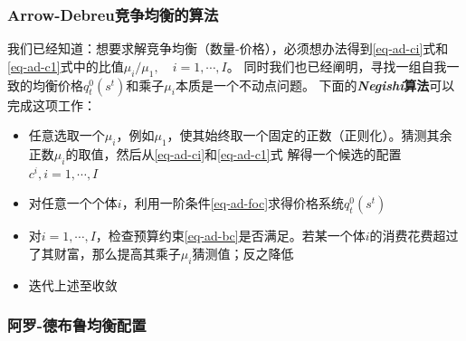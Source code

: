 \subsubsection{Arrow-Debreu竞争均衡的算法}  \label{subsubsec-ad-compu}

我们已经知道：想要求解竞争均衡（数量-价格），必须想办法得到\ref{eq-ad-ci}式和\ref{eq-ad-c1}式中的比值$\mu_i/\mu_1, \quad i=1,\cdots,I$。
同时我们也已经阐明，寻找一组自我一致的均衡价格$q_t^0\left(s^t\right)$和乘子$\mu_i$本质是一个不动点问题。
下面的\textbf{\textit{Negishi}算法}可以完成这项工作：
\begin{itemize}
    \item 任意选取一个$\mu_i$，例如$\mu_1$，使其始终取一个固定的正数（正则化）。猜测其余正数$\mu_i$的取值，然后从\ref{eq-ad-ci}和\ref{eq-ad-c1}式
        解得一个候选的配置$c^i, i=1,\cdots,I$
    \item 对任意一个个体$i$，利用一阶条件\ref{eq-ad-foc}求得价格系统$q_t^0\left(s^t\right)$
    \item 对$i=1,\cdots,I$，检查预算约束\ref{eq-ad-bc}是否满足。若某一个体$i$的消费花费超过了其财富，那么提高其乘子$\mu_i$猜测值；反之降低
    \item 迭代上述至收敛
\end{itemize}


\subsubsection{阿罗-德布鲁均衡配置}

